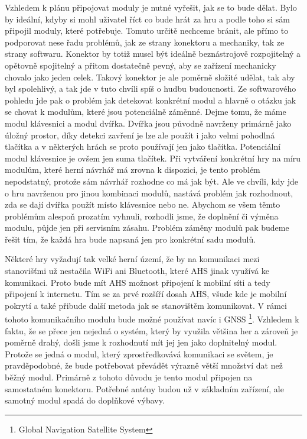 Vzhledem k plánu připojovat moduly je nutné vyřešit, jak se to bude dělat.
Bylo by ideální, kdyby si mohl uživatel říct co bude hrát za hru a podle toho si sám připojil moduly, které potřebuje.
Tomuto určitě nechceme bránit, ale přímo to podporovat nese řadu problémů, jak ze strany konektoru a mechaniky, tak ze strany softwaru.
Konektor by totiž musel být ideálně beznástrojově rozpojitelný a opětovně spojitelný a přitom dostatečně pevný, aby se zařízení mechanicky chovalo jako jeden celek.
Takový konektor je ale poměrně složité udělat, tak aby byl spolehlivý, a tak jde v tuto chvíli spíš o hudbu budoucnosti.
Ze softwarového pohledu jde pak o problém jak detekovat konkrétní modul a hlavně o otázku jak se chovat k modulům, které jsou potenciálně záměnné.
Dejme tomu, že máme modul klávesnici a modul dvířka.
Dvířka jsou původně navrženy primárně jako úložný prostor, díky detekci zavření je lze ale použít i jako velmi pohodlná tlačítka a v některých hrách se proto používají jen jako tlačítka.
Potenciální modul klávesnice je ovšem jen suma tlačítek.
Při vytváření konkrétní hry na míru modulům, které herní návrhář má zrovna k dispozici, je tento problém nepodstatný, protože sám návrhář rozhodne co má jak být.
Ale ve chvíli, kdy jde o hru navrženou pro jinou kombinaci modulů, nastává problém jak rozhodnout, zda se dají dvířka použít místo klávesnice nebo ne.
Abychom se všem těmto problémům alespoň prozatím vyhnuli, rozhodli jsme, že doplnění či výměna modulu, půjde jen při servisním zásahu.
Problém záměny modulů pak budeme řešit tím, že každá hra bude napsaná jen pro konkrétní sadu modulů.

Některé hry vyžadují tak velké herní území, že by na komunikaci mezi stanovišťmi už nestačila WiFi ani Bluetooth, které AHS jinak využívá ke komunikaci.  
Proto bude mít AHS možnost připojení k mobilní síti a tedy připojení k internetu.
Tím se za prvé rozšíří dosah AHS, všude kde je mobilní pokrytí a také přibude další metoda jak se stanovištěm komunikovat.
V rámci tohoto komunikačního modulu bude možné používat navíc i GNSS \footnote{Global Navigation Satellite System}.
Vzhledem k faktu, že se přece jen nejedná o systém, který by využila většina her a zároveň je poměrně drahý, došli jsme k rozhodnutí mít jej jen jako doplnitelný modul.
Protože se jedná o modul, který zprostředkovává komunikaci se světem, je pravděpodobné, že bude potřebovat převádět výrazně větší množství dat než běžný modul.
Primárně z tohoto důvodu je tento modul připojen na samostatném konektoru.
Potřebné antény budou už v základním zařízení, ale samotný modul spadá do doplňkové výbavy.

